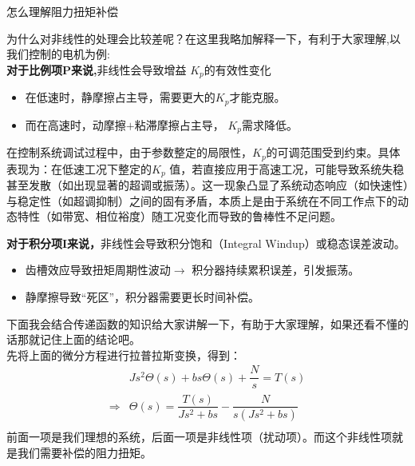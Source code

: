 \documentclass[UTF8,a4paper,12pt]{ctexart}
\begin{document}
\begin{titlebox}{怎么理解阻力扭矩补偿}
           \begin{flushleft}
              为什么对非线性的处理会比较差呢？在这里我略加解释一下，有利于大家理解,以我们控制的电机为例:
              \\\textbf{对于比例项P来说,}非线性会导致增益 $K_p$的有效性变化
            \begin{itemize} 
              \item 在低速时，静摩擦占主导，需要更大的$K_p$才能克服。
              \item 而在高速时，动摩擦$+$粘滞摩擦占主导， $K_p$需求降低。
            \end{itemize}
           \end{flushleft}
          \begin{flushleft}
            在控制系统调试过程中，由于参数整定的局限性，$K_p$的可调范围受到约束。具体表现为：在低速工况下整定的$K_p$ 值，若直接应用于高速工况，可能导致系统失稳甚至发散（如出现显著的超调或振荡）。这一现象凸显了系统动态响应（如快速性）与稳定性（如超调抑制）之间的固有矛盾，本质上是由于系统在不同工作点下的动态特性（如带宽、相位裕度）随工况变化而导致的鲁棒性不足问题。
          \end{flushleft}
           \begin{flushleft}
            \textbf{对于积分项I来说，}非线性会导致积分饱和（Integral Windup）或稳态误差波动。
            \begin{itemize} 
              \item 齿槽效应导致扭矩周期性波动$\rightarrow$ 积分器持续累积误差，引发振荡。
              \item 静摩擦导致“死区”，积分器需要更长时间补偿。
            \end{itemize}
           \end{flushleft}
           \begin{flushleft}
            {\scriptsize 下面我会结合传递函数的知识给大家讲解一下，有助于大家理解，如果还看不懂的话那就记住上面的结论吧。\\
            先将上面的微分方程进行拉普拉斯变换，得到：
            \begin{align*}
              &Js^2\varTheta \left( s \right) +bs\varTheta \left( s \right) +\dfrac{N}{s}=T\left( s \right) \\
              \Rightarrow&\varTheta \left( s \right) =\dfrac{T\left( s \right)}{Js^2+bs}-\dfrac{N}{s\left( Js^2+bs \right)}\\
            \end{align*} 
            前面一项是我们理想的系统，后面一项是非线性项（扰动项）。而这个非线性项就是我们需要补偿的阻力扭矩。\\
}
\end{flushleft}
\end{titlebox}
\end{document}
